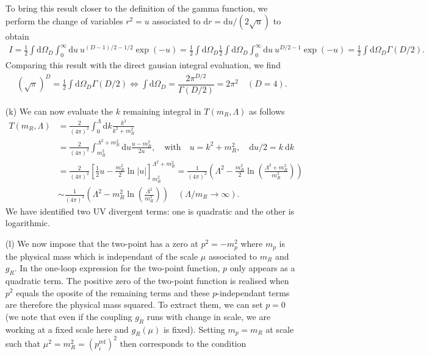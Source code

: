 \documentclass[10pt, a4paper]{article}
\begin{document}
\begin{enumerate}
\begin{align*}
  \end{align*}
  To bring this result closer to the definition of the gamma function, we perform the change of variables $r^2 = u$ associated to $\text{d}r = \text{d}u/(2\sqrt{u})$ to obtain
  \begin{align*}
    I =\frac{1}{2}\int \text{d}\Omega_D \int_{0}^{\infty} \text{d}u \ u^{(D-1)/2-1/2}  \exp\left(-u\right) = \frac{1}{2} \int \text{d}\Omega_D \frac{1}{2}\int \text{d}\Omega_D \int_{0}^{\infty} \text{d}u \ u^{D/2 - 1}  \exp\left(-u\right) = \frac{1}{2} \int \text{d}\Omega_D \Gamma(D/2).
  \end{align*}
  Comparing this result with the direct gausian integral evaluation, we find
  \begin{align*}
    (\sqrt{\pi})^D = \frac{1}{2} \int \text{d}\Omega_D \Gamma(D/2) \iff \int \text{d}\Omega_D = \dfrac{2 \pi^{D/2}}{\Gamma(D/2)} =  2 \pi^2 \quad (D=4). 
  \end{align*}
  \newpage
  \item[(k)] We can now evaluate the $k$ remaining integral in $T(m_R, \Lambda)$ as follows
  \begin{align*}
    T(m_R, \Lambda) &= \frac{2}{(4\pi)^2} \int_0^{\Lambda} \text{d}k \frac{k^3}{k^2 + m_R^2}\\
    &= \frac{2}{(4\pi)^2} \int_{m_R^2}^{\Lambda^2 + m_R^2} \text{d}u \frac{u-m_R^2}{2u}, \quad \text{with} \quad u = k^2 + m_R^2, \quad \text{d}u/2 = k \ \text{d}k\\
    &= \frac{2}{(4\pi)^2} \left[\frac{1}{2}u - \frac{m_R^2}{2} \ln|u|\right]_{m_R^2}^{\Lambda^2 + m_R^2} = \frac{1}{(4\pi)^2} \left(\Lambda^2 - \frac{m_R^2}{2} \ln\left(\frac{\Lambda^2 + m_R^2}{m_R^2}\right)\right)\\& \sim \frac{1}{(4\pi)^2} \left(\Lambda^2 - m_R^2 \ln\left(\frac{\Lambda^2}{m_R^2}\right)\right)\quad (\Lambda/m_R \to \infty).
  \end{align*}
  We have identified two UV divergent terms: one is quadratic and the other is logarithmic.
  \item[(l)] We now impose that the two-point has a zero at $p^2 = -m_{p}^2$ where $m_{p}$ is the physical mass which is independant of the scale $\mu$ associated to $m_R$ and $g_R$. In the one-loop expression for the two-point function, $p$ only appears as a quadratic term. The positive zero of the two-point function is realised when $p^2$ equals the oposite of the remaining terms and these $p$-independant terms are therefore the physical mass squared. To extract them, we can set $p=0$ (we note that even if the coupling $g_R$ runs with change in scale, we are working at a fixed scale here and $g_R(\mu)$ is fixed). Setting $m_p = m_R$ at scale such that $\mu^2 = m_R^2 = (p_i^{\text{ref}})^2$ then corresponds to the condition

\end{enumerate}
\end{document}
